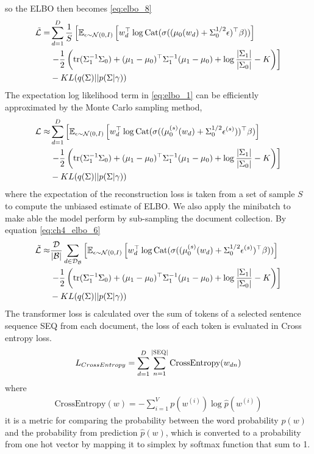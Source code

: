 so the ELBO then becomes \ref{eq:elbo_8}
\begin{align}\label{eq:elbo_8}
\tilde{\mathcal{L}}=&\sum_{d=1}^{D}\frac{1}{S}\left[\mathbb{E}_{\epsilon\sim\mathcal{N}(0,I)}\left[w_d^\top\log\text{Cat}(\sigma((\mu_0(w_d)+\Sigma_0^{1/2}\epsilon)^\top\beta))\right]\right.\notag\\
&\left.-\frac{1}{2}\left(\text{tr}(\Sigma_1^{-1}\Sigma_0)+(\mu_1-\mu_0)^\top\Sigma_1^{-1}(\mu_1-\mu_0)+\log\frac{|\Sigma_1|}{|\Sigma_0|}-K\right)\right]\notag\\
&-KL(q(\Sigma)||p(\Sigma|\gamma))
\end{align}
The expectation log likelihood term in \ref{eq:elbo_1} can be efficiently approximated by the Monte Carlo sampling method,
\begin{align}\label{eq:elbo_2}
\mathcal{L}\approx&\sum_{d=1}^{D}\left[\mathbb{E}_{\epsilon\sim\mathcal{N}(0,I)}\left[w_d^\top\log\text{Cat}(\sigma((\mu_0^{(s)}(w_d)+\Sigma_0^{1/2}\epsilon^{(s)}))^\top\beta)\right]\right.\notag\\
&\left.-\frac{1}{2}\left(\text{tr}(\Sigma_1^{-1}\Sigma_0)+(\mu_1-\mu_0)^\top\Sigma_1^{-1}(\mu_1-\mu_0)+\log\frac{|\Sigma_1|}{|\Sigma_0|}-K\right)\right]\notag\\
&-KL(q(\Sigma)||p(\Sigma|\gamma))
\end{align}
where the expectation of the reconstruction loss is taken from a set of sample $ S $ to compute the unbiased estimate of ELBO. We also apply the minibatch to make able the model perform by sub-sampling the document collection. By equation \ref{eq:ch4_elbo_6}
\begin{align}\label{eq:ch4_elbo_6}
\tilde{\mathcal{L}}\approx&\frac{\mathcal{D}}{|\mathcal{B}|}\sum_{d\in\mathcal{D_B}}\left[\mathbb{E}_{\epsilon\sim\mathcal{N}(0,I)}\left[w_d^\top\log\text{Cat}(\sigma((\mu_0^{(s)}(w_d)+\Sigma_0^{1/2}\epsilon^{(s)})^\top\beta))\right]\right.\notag\\
&\left.-\frac{1}{2}\left(\text{tr}(\Sigma_1^{-1}\Sigma_0)+(\mu_1-\mu_0)^\top\Sigma_1^{-1}(\mu_1-\mu_0)+\log\frac{|\Sigma_1|}{|\Sigma_0|}-K\right)\right]\notag\\
&-KL(q(\Sigma)||p(\Sigma|\gamma))
\end{align}
The transformer loss is calculated over the sum of tokens of a selected sentence sequence \textsc{SEQ} from each document, the loss of each token is evaluated in Cross entropy loss.
\begin{equation}\label{ch4:eq_cross_entropy}
L_{CrossEntropy}=\sum_{d=1}^{D}\sum_{n=1}^{|\textsc{SEQ}|}\text{CrossEntropy}(w_{dn})
\end{equation}
where
\begin{align}
\text{CrossEntropy}(w) = -\sum_{i=1}^{V}p(w^{(i)})\log \hat{p}(w^{(i)})
\end{align}
it is a metric for comparing the probability between the word probability $ p(w) $ and the probability from prediction $ \hat{p}(w) $, which is converted to a probability from one hot vector by mapping it to simplex by softmax function that sum to 1.
